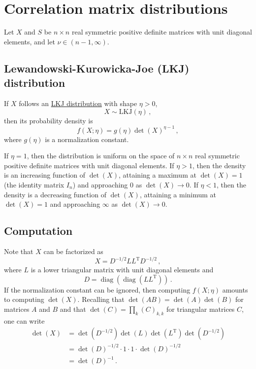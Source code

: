 \documentclass[12pt]{article}
\DeclareMathOperator{\diag}{diag}
\newcommand{\transpose}[1]{#1^{\mathrm{T}}}
\begin{document}
\setlength{\parskip}{5mm}
\setlength{\parindent}{0mm}

\section{Correlation matrix distributions}

Let $X$ and $S$ be $n \times n$ real symmetric positive definite matrices
with unit diagonal elements, and let $\nu \in (n - 1, \infty)$.

\subsection{Lewandowski-Kurowicka-Joe (LKJ) distribution}

If $X$ follows an
\href{https://mc-stan.org/docs/2_27/functions-reference/lkj-correlation.html}{LKJ distribution}
with shape $\eta > 0$,
\begin{equation}
X \sim \mathrm{LKJ}(\eta)\,,
\end{equation}
then its probability density is
\begin{equation}
f(X;\eta) = g(\eta) \det(X)^{\eta - 1}\,,
\end{equation}
where $g(\eta)$ is a normalization constant.

If $\eta = 1$, then the distribution is uniform on the space of
$n \times n$ real symmetric positive definite matrices with unit
diagonal elements.
%
If $\eta > 1$, then the density is an increasing function of $\det(X)$,
attaining a maximum at $\det(X) = 1$ (the identity matrix $I_n$)
and approaching $0$ as $\det(X) \to 0$.
%
If $\eta < 1$, then the density is a decreasing function of $\det(X)$,
attaining a minimum at $\det(X) = 1$
and approaching $\infty$ as $\det(X) \to 0$.

\subsection{Computation}

Note that $X$ can be factorized as
\begin{equation}
X = D^{-1/2} L \transpose{L} D^{-1/2}\,,
\end{equation}
where $L$ is a lower triangular matrix with unit diagonal elements
and
\begin{equation}
D = \diag(\diag(L \transpose{L}))\,.
\end{equation}
If the normalization constant can be ignored,
then computing $f(X;\eta)$ amounts to computing $\det(X)$.
Recalling that
$\det(A B) = \det(A) \det(B)$ for matrices $A$ and $B$
and that
$\det(C) = \prod_{k} (C)_{k,k}$ for triangular matrices $C$,
one can write
\begin{equation}
\begin{aligned}
\det(X)
  &= \det(D^{-1/2}) \det(L) \det(\transpose{L}) \det(D^{-1/2}) \\
  &= \det(D)^{-1/2} \cdot 1 \cdot 1 \cdot \det(D)^{-1/2} \\
  &= \det(D)^{-1}\,.
\end{aligned}
\end{equation}
\end{document}
